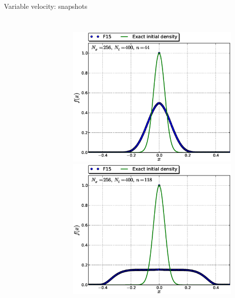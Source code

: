 \documentclass{beamer}
\begin{document}
\begin{frame}{Variable velocity: snapshots}
\begin{columns}
\begin{figure}
\end{figure}
\begin{figure}
\centering
 \includegraphics[width=\textwidth]{graphics/f_N_v_S_F15_Nx256Nt400_w_f0_it00044}\\ \vspace*{-4mm}
 \includegraphics[width=\textwidth]{graphics/f_N_v_S_F15_Nx256Nt400_w_f0_it00118}
\end{figure}
 \end{columns}

\end{frame}
\end{document}
